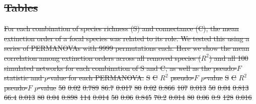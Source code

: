 \documentclass[12pt]{article}
\providecommand{\DIFdel}[1]{{\protect\color{red}\sout{#1}}}                      %
\providecommand{\DIFdelbegin}{\protect\color{red}} %
\providecommand{\DIFdelFL}[1]{\DIFdel{#1}} %
\newcommand{\DIFscaledelfig}{0.5}
\newlength{\DIFdelgraphicswidth} %
\newlength{\DIFdelgraphicsheight} %
\newcommand{\DIFdelincludegraphics}[2][]{%
\sbox{\DIFdelgraphicsbox}{\DIFOincludegraphics[#1]{#2}}%
\settoboxwidth{\DIFdelgraphicswidth}{\DIFdelgraphicsbox} %
\settoboxtotalheight{\DIFdelgraphicsheight}{\DIFdelgraphicsbox} %
\scalebox{\DIFscaledelfig}{%
\parbox[b]{\DIFdelgraphicswidth}{\usebox{\DIFdelgraphicsbox}\\[-\baselineskip] \rule{\DIFdelgraphicswidth}{0em}}\llap{\resizebox{\DIFdelgraphicswidth}{\DIFdelgraphicsheight}{%
\setlength{\unitlength}{\DIFdelgraphicswidth}%
\begin{picture}(1,1)%
\thicklines\linethickness{2pt} %
{\color[rgb]{1,0,0}\put(0,0){\framebox(1,1){}}}%
{\color[rgb]{1,0,0}\put(0,0){\line( 1,1){1}}}%
{\color[rgb]{1,0,0}\put(0,1){\line(1,-1){1}}}%
\end{picture}%
}\hspace*{3pt}}} %
} %
\DeclareRobustCommand{\DIFdelbegin}{\DIFOdelbegin \let\includegraphics\DIFdelincludegraphics} %
\begin{document}
\begin{spacing}{2.0}
\clearpage
     

\clearpage
\DIFdelbegin \section*{\DIFdel{Tables}}
{%
\DIFdelFL{For each combination of species richness (S) and connectance (C), the mean extinction order of a focal species was related to its role. We tested this using a series of PERMANOVAs with 9999 permutations each. Here we show the mean correlation among extinction orders across all removed species ($R^2$) and all 100 simulated networks for each combination of S and C, as well as the pseudo-$F$ statistic and $p$-value for each PERMANOVA.}}
\DIFdelFL{S }%
\DIFdelFL{C }%
\DIFdelFL{$R^2$ }%
\DIFdelFL{pseudo-$F$  }%
\DIFdelFL{$p$-value }%
\DIFdelFL{S }%
\DIFdelFL{C }%
\DIFdelFL{$R^2$ }%
\DIFdelFL{pseudo-$F$  }%
\DIFdelFL{$p$-value}%
\DIFdelFL{50  }%
\DIFdelFL{0.02  }%
\DIFdelFL{0.789 }%
\DIFdelFL{86.7  }%
\DIFdelFL{0.017 }%
\DIFdelFL{80  }%
\DIFdelFL{0.02  }%
\DIFdelFL{0.866 }%
\DIFdelFL{107 }%
\DIFdelFL{0.013 }%
\DIFdelFL{50  }%
\DIFdelFL{0.04  }%
\DIFdelFL{0.813 }%
\DIFdelFL{66.4  }%
\DIFdelFL{0.013 }%
\DIFdelFL{80  }%
\DIFdelFL{0.04  }%
\DIFdelFL{0.898 }%
\DIFdelFL{114 }%
\DIFdelFL{0.014 }%
\DIFdelFL{50  }%
\DIFdelFL{0.06  }%
\DIFdelFL{0.845 }%
\DIFdelFL{70.2  }%
\DIFdelFL{0.014 }%
\DIFdelFL{80  }%
\DIFdelFL{0.06  }%
\DIFdelFL{0.9 }%
\DIFdelFL{128 }%
\DIFdelFL{0.016 }%

\end{spacing}
\end{document}
